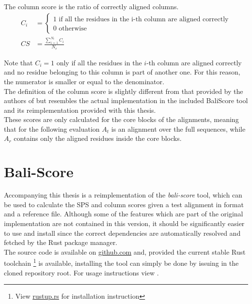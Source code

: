 \begin{mydef}
	The column score is the ratio of correctly aligned columns. 
	\begin{align*}
	C_i &= \begin{cases}
	1 \text{ if all the residues in the i-th column are aligned correctly}\\
	0 \text{ otherwise}
	\end{cases} \\
	CS &= \frac{\sum_{i=1}^{N_t} C_i}{N_r}
	\end{align*}
	\label{def:column-score}
\end{mydef}
Note that $C_i = 1$ only if all the residues in the $i$-th column are aligned correctly and no residue belonging to this column is part of another one. For this reason, the numerator is smaller or equal to the denominator.\\
The definition of the column score is slightly different from that provided by the authors of \bb \cite{thompson1999comprehensive} but resembles the actual implementation in the included BaliScore tool and its reimplementation provided with this thesis.\\
These scores are only calculated for the core blocks of the \bb alignments, meaning that for the following evaluation $A_t$ is an alignment over the full sequences, while $A_r$ contains only the aligned residues inside the core blocks.


\section{Bali-Score}
Accompanying this thesis is a reimplementation of the \textit{bali-score} tool, which can be used to calculate the SPS and column scores given a test alignment in  format and a \bb reference  file. Although some of the features which are part of the original implementation are not contained in this version, it should be significantly easier to use and install since the correct dependencies are automatically resolved and fetched by the Rust package manager.\\
The source code is available on \href{https://github.com/robinhundt/bali-score}{github.com} and, provided the current stable Rust toolchain \footnote{View \href{https://rustup.rs}{rustup.rs} for installation instruction} is available, installing the tool can simply be done by issuing  in the cloned repository root. For usage instructions view .

